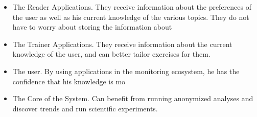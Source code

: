 \begin{itemize}
	\item The Reader Applications. They receive information about the preferences of the user as well as his current knowledge of the various topics. They do not have to worry about storing the information about 

	\item The Trainer Applications. They receive information about the current knowledge of the user, and can better tailor exercises for them.
	
	\item The user. By using applications in the monitoring ecosystem, he has the confidence that his knowledge is mo

	\item The Core of the System. Can benefit from running anonymized analyses and discover trends and run scientific experiments.
\end{itemize}

